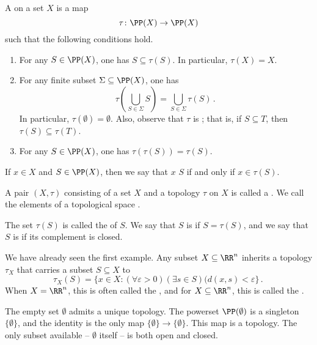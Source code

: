 \begin{dfn}
	A  on a set $X$ is a map%
	\[
		\tau \colon \PP(X) \to \PP(X)
	\]
	such that the following conditions hold.
	\begin{enumerate}
		\item For any $ S \in \PP(X) $, one has $ S \subseteq \tau(S) $.
		In particular, $ \tau(X) = X $.
		\item For any finite subset $ \Sigma \subseteq \PP(X) $, one has
		\[
			\tau \left( \bigcup_{ S \in \Sigma} S \right) = \bigcup_{ S \in \Sigma } \tau(S) \period
		\]
		In particular,%
		$ \tau (\emptyset) = \emptyset $.
		Also, observe that $\tau$ is ;
		that is, if $S \subseteq T$, then $\tau(S) \subseteq \tau(T)$.
		\item For any $ S \in \PP(X) $, one has $ \tau( \tau( S ) ) = \tau( S )$.
	\end{enumerate}

	If $ x \in X $ and $ S \in \PP(X) $, then we say that $ x $  $ S $ if and only if $ x \in \tau(S) $.

	A pair $ (X, \tau) $ consisting of a set $ X $ and a topology $ \tau $ on $ X $ is called a .
	We call the elements of a topological space .

	The set $\tau(S)$ is called the  of $ S $.
	We say that $ S $ is  if $ S = \tau( S ) $, and we say that $ S $ is  if its complement is closed.%
\end{dfn}

\begin{exm}
	We have already seen the first example.
	Any subset $X \subseteq \RR^n$ inherits a topology $\tau_X$ that carries a subset $S \subseteq X$ to 
	\[
		\tau_X(S) = \{ x\in X : (\forall \varepsilon>0)(\exists s \in S)(d(x,s)<\varepsilon\} \period
	\]
	When $X=\RR^n$, this is often called the ,
	and for $X \subseteq \RR^n$, this is called the .
\end{exm}

\begin{exm}
	The empty set $ \emptyset $ admits a unique topology.
	The powerset $ \PP( \emptyset ) $ is a singleton $ \{ \emptyset \} $, and the identity is the only map $ \{ \emptyset \} \to \{ \emptyset \} $.
	This map is a topology.
	The only subset available -- $ \emptyset $ itself -- is both open and closed.
\end{exm}

